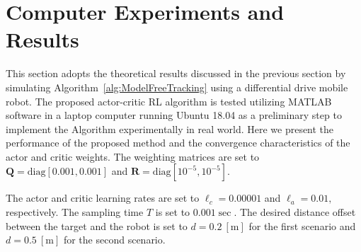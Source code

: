 \documentclass[conference]{IEEEtran}
\begin{document}
  

 \section{Computer Experiments and Results}
 \label{sec:resultsExperiments}

 This section adopts the theoretical results discussed in the previous section by simulating Algorithm~\ref{alg:ModelFreeTracking} using a differential drive mobile robot. The proposed actor-critic RL algorithm is tested  utilizing MATLAB software in a laptop computer running Ubuntu 18.04 as a preliminary step to implement the Algorithm experimentally in real world. Here we present the performance of the proposed method and the convergence characteristics of the actor and critic weights. The weighting matrices are set to $\mathbf{Q} = \mathrm{diag}[0.001,0.001]$ and $\mathbf{R} = \mathrm{diag}[10^{-5}, 10^{-5}].$ %
  
  
 The actor and critic learning rates are set to $\ell_c = 0.00001$ and $\ell_a=0.01,$ respectively. The sampling time $T$ is set to $0.001 \sec.$ The desired distance offset between the target and the robot is set to $ d = 0.2~[\si{\meter}]$ for the first scenario and $d = 0.5~[\si{\meter}]$ for the second scenario. 
\end{document}
